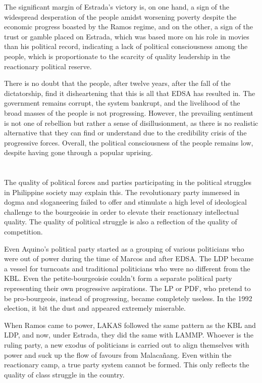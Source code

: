 The significant margin of Estrada's victory is, 
on one hand, a sign of the widespread desperation of the people 
amidst worsening poverty despite the economic progress 
boasted by the Ramos regime, 
and on the other, a sign of the trust or gamble placed on Estrada, 
which was based more on his role in movies than his political record, 
indicating a lack of political consciousness among the people, 
which is proportionate to the scarcity of quality leadership 
in the reactionary political reserve.

There is no doubt that the people, after twelve years, 
after the fall of the dictatorship, 
find it disheartening that this is all that EDSA has resulted in. 
The government remains corrupt, the system bankrupt, 
and the livelihood of the broad masses of the people is not progressing. 
However, the prevailing sentiment is not one of rebellion 
but rather a sense of disillusionment, 
as there is no realistic alternative that they can find or understand 
due to the credibility crisis of the progressive forces. 
Overall, the political consciousness of the people remains low, 
despite having gone through a popular uprising.


\section{}
The quality of political forces and parties participating 
in the political struggles in Philippine society may explain this. 
The revolutionary party immersed in dogma and sloganeering 
failed to offer and stimulate a high level of ideological challenge 
to the bourgeoisie in order to elevate their reactionary intellectual quality. 
The quality of political struggle 
is also a reflection of the quality of competition.

Even Aquino's political party started as a grouping of various politicians 
who were out of power during the time of Marcos and after EDSA. 
The LDP became a vessel for turncoats and traditional politicians 
who were no different from the KBL. 
Even the petite-bourgeoisie couldn't form a separate political party 
representing their own progressive aspirations. 
The LP or PDF, who pretend to be pro-bourgeois, 
instead of progressing, became completely useless. 
In the 1992 election, it bit the dust and appeared extremely miserable.

When Ramos came to power, LAKAS followed the same pattern as the KBL and LDP, 
and now, under Estrada, they did the same with LAMMP. 
Whoever is the ruling party, a new exodus of politicians is carried out 
to align themselves with power and suck up the flow of favours from Malacañang. 
Even within the reactionary camp, a true party system cannot be formed. 
This only reflects the quality of class struggle in the country.

